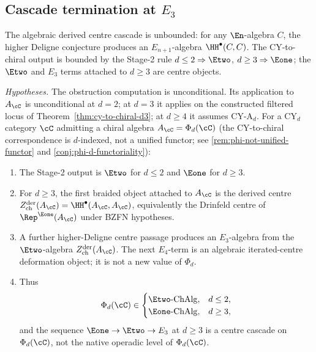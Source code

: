 \subsection{Cascade termination at \texorpdfstring{$E_3$}{E-3}}
\label{subsec:cascade-termination-proof}

The algebraic derived centre cascade is unbounded: for any $\En$-algebra $C$, the higher Deligne conjecture produces an $E_{n+1}$-algebra $\HH^\bullet(C, C)$. The CY-to-chiral output is bounded by the Stage-2 rule \(d\leq2\Rightarrow \Etwo\), \(d\geq3\Rightarrow \Eone\); the \(\Etwo\) and \(E_3\) terms attached to \(d\geq3\) are centre objects.

\begin{proposition}
\label{prop:cascade-termination}
\noindent\emph{Hypotheses.} The obstruction computation is unconditional. Its application to $A_\cC$ is unconditional at $d = 2$; at $d = 3$ it applies on the constructed filtered locus of Theorem~\ref{thm:cy-to-chiral-d3}; at $d \geq 4$ it assumes CY-A$_d$.
For a CY$_d$ category $\cC$ admitting a chiral algebra $A_\cC = \Phi_d(\cC)$ (the CY-to-chiral correspondence is $d$-indexed, not a unified functor; see \ref{rem:phi-not-unified-functor} and \ref{conj:phi-d-functoriality}):
\begin{enumerate}[label=\textup{(\roman*)}]
 \item The Stage-2 output is $\Etwo$ for \(d\leq2\) and $\Eone$ for \(d\geq3\).
 \item For \(d\geq3\), the first braided object attached to \(A_\cC\) is the derived centre \(Z^{\mathrm{der}}_{\mathrm{ch}}(A_\cC)=\HH^\bullet(A_\cC,A_\cC)\), equivalently the Drinfeld centre of \(\Rep^{\Eone}(A_\cC)\) under BZFN hypotheses.
 \item A further higher-Deligne centre passage produces an \(E_3\)-algebra from the \(\Etwo\)-algebra \(Z^{\mathrm{der}}_{\mathrm{ch}}(A_\cC)\). The next \(E_4\)-term is an algebraic iterated-centre deformation object; it is not a new value of \(\Phi_d\).
 \item Thus
 \[
  \Phi_d(\cC)\in
  \begin{cases}
   \Etwo\text{-}\mathrm{ChAlg}, & d\leq2,\\
   \Eone\text{-}\mathrm{ChAlg}, & d\geq3,
  \end{cases}
 \]
 and the sequence \(\Eone\to\Etwo\to E_3\) at \(d\geq3\) is a centre cascade on \(\Phi_d(\cC)\), not the native operadic level of \(\Phi_d(\cC)\).
\end{enumerate}
\end{proposition}

